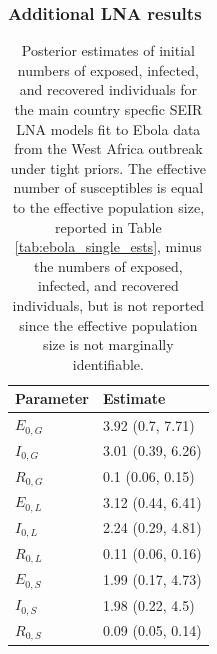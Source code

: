 \subsubsection{Additional LNA results}
\label{subsubsec:ebola_single_res}

\begin{table}[htbp]
	\caption[Posterior estimates of initial numbers of exposed, infected, and recovered individuals for country--specific SEIR LNA models fit to Ebola outbreak data.]{Posterior estimates of initial numbers of exposed, infected, and recovered individuals for the main country specfic SEIR LNA models fit to Ebola data from the West Africa outbreak under tight priors. The effective number of susceptibles is equal to the effective population size, reported in Table \ref{tab:ebola_single_ests}, minus the numbers of exposed, infected, and recovered individuals, but is not reported since the effective population size is not marginally identifiable.}
	\label{tab:ebola_single_initdist_res}
	\centering
	\begin{tabular}{ll}
		\hline
		\textbf{Parameter} & \textbf{Estimate }\\ 
		\hline
		$ E_{0,G} $& 3.92 (0.7, 7.71) \\ 
		$ I_{0,G} $& 3.01 (0.39, 6.26) \\ 
		$ R_{0,G} $& 0.1 (0.06, 0.15) \\ 
		\hline
		$ E_{0,L} $& 3.12 (0.44, 6.41) \\ 
		$ I_{0,L} $& 2.24 (0.29, 4.81) \\ 
		$ R_{0,L} $& 0.11 (0.06, 0.16) \\ 
		\hline
		$ E_{0,S} $& 1.99 (0.17, 4.73) \\ 
		$ I_{0,S} $& 1.98 (0.22, 4.5) \\ 
		$ R_{0,S} $& 0.09 (0.05, 0.14) \\ 
		\hline
	\end{tabular}
\end{table}

